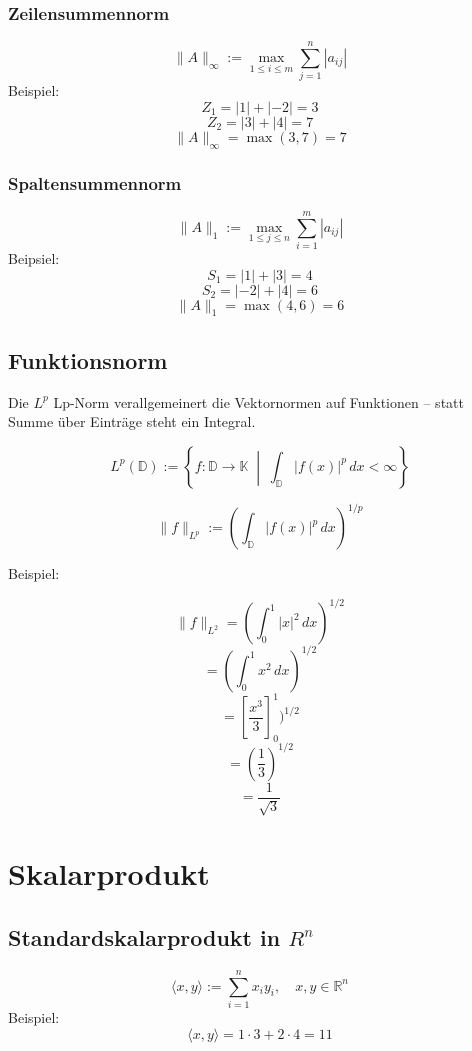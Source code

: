 \documentclass[9pt,a4paper]{article}
\begin{document}
    \subsubsection{Zeilensummennorm}
    $$\|A\|_\infty := \max_{1 \leq i \leq m} \sum_{j=1}^{n} |a_{ij}|$$
    Beispiel:
    $$Z_1 = |1| + |-2| = 3$$
    $$Z_2 = |3| + |4|  = 7$$
    $$\|A\|_\infty = \max(3, 7) = 7$$
    
    \subsubsection{Spaltensummennorm}
    $$\|A\|_1 := \max_{1 \leq j \leq n} \sum_{i=1}^{m} |a_{ij}|$$
    Beipsiel:
    $$S_1 = |1| + |3|  = 4$$
    $$S_2 = |-2| + |4| = 6$$
    $$\|A\|_1 = \max(4, 6) = 6$$
    
    \subsection{Funktionsnorm}
    
    Die $L^p$
    Lp-Norm verallgemeinert die Vektornormen auf
    Funktionen – statt Summe über Einträge steht ein Integral.
    
    $$L^p(\mathbb{D}) := \left\{ f : \mathbb{D} \to \mathbb{K} \;\middle|\; \int_{\mathbb{D}} |f(x)|^p \, dx < \infty \right\}$$
    
    $$\|f\|_{L^p} := \left( \int_{\mathbb{D}} |f(x)|^p \, dx \right)^{1/p}$$
    
    Beispiel:
    
    
    $$\|f\|_{L^2} = \left( \int_0^1 |x|^2 \, dx \right)^{1/2}$$
    $$= \left( \int_0^1 x^2 \, dx \right)^{1/2}$$
    $$= \left[ \frac{x^3}{3} \right]_0^1 )^{1/2}$$
    $$= \left( \frac{1}{3} \right)^{1/2}$$
    $$= \frac{1}{\sqrt{3}}$$
    
    \section{Skalarprodukt}
    
    \subsection{Standardskalarprodukt in $R^n$}
    $$\langle x, y \rangle := \sum_{i=1}^{n} x_i y_i, \quad x, y \in \mathbb{R}^n$$
    Beispiel:
    $$\langle x, y \rangle = 1 \cdot 3 + 2 \cdot 4 = 11$$
    
\end{document}
